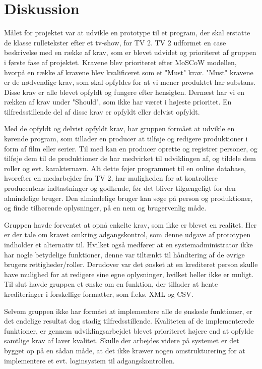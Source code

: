 \newpage
\section{Diskussion}

Målet for projektet var at udvikle en prototype til et program, der skal
erstatte de klasse rulletekster efter et tv-show, for TV 2. TV 2 udformet en
case beskrivelse med en række af krav, som er blevet udvidet og prioriteret af
gruppen i første fase af projektet. Kravene blev prioriteret efter MoSCoW
modellen, hvorpå en række af kravene blev kvalificeret som et "Must" krav.
"Must" kravene er de nødvendige krav, som skal opfyldes for at vi mener
produktet har substans. Disse krav er alle blevet opfyldt og fungere efter
hensigten. Dernæst har vi en rækken af krav under "Should", som ikke har været i
højeste prioritet. En tilfredsstillende del af disse krav er opfyldt eller
delvist opfyldt.

Med de opfyldt og delvist opfyldt krav, har gruppen formået at udvikle en
kørende program, som tillader en producer at tilføje og redigere produktioner i
form af film eller serier. Til med kan en producer oprette og registrer
personer, og tilføje dem til de produktioner de har medvirket til udviklingen
af, og tildele dem roller og evt. karakternavn. Alt dette føjer programmet til
en online database, hvorefter en medarbejder fra TV 2, har muligheden for at
kontrollere producentens indtastninger og godkende, før det bliver tilgængeligt
for den almindelige bruger. Den almindelige bruger kan søge på person og
produktioner, og finde tilhørende oplysninger, på en nem og brugervenlig måde. 

Gruppen havde forventet at opnå enkelte krav, som ikke er blevet en realitet.
Her er der tale om kravet omkring adgangskontrol, som denne udgave af prototypen
indholder et alternativ til. Hvilket også medfører at en systemadministrator
ikke har nogle betydelige funktioner, denne var tiltænkt til håndtering af de
øvrige brugers rettigheder/roller. Derudover var det ønsket at en krediteret
person skulle have mulighed for at redigere sine egne oplysninger, hvilket
heller ikke er muligt. Til slut havde gruppen et ønske om en funktion, der
tillader at hente krediteringer i forskellige formatter, som f.eks. XML og CSV. 

Selvom gruppen ikke har formået at implementere alle de ønskede funktioner, er
det endelige resultat dog stadig tilfredsstillende. Kvaliteten af de
implementerede funktioner, er gennem udviklingsarbejdet blevet prioriteret
højere end at opfylde samtlige krav af laver kvalitet. Skulle der arbejdes
videre på systemet er det bygget op på en sådan måde, at det ikke kræver nogen
omstrukturering for at implementere et evt. loginsystem til adgangskontrollen.


